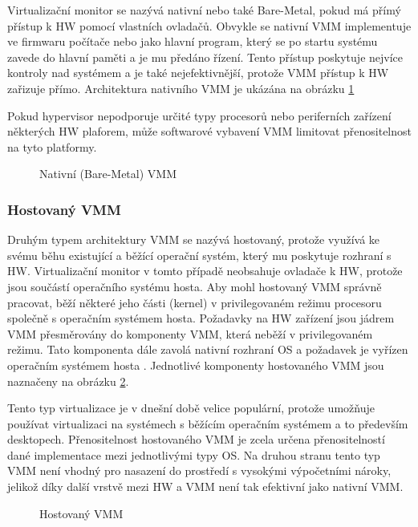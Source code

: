 Virtualizační monitor se nazývá nativní nebo také Bare-Metal, pokud má přímý přístup k HW pomocí vlastních ovladačů. Obvykle se nativní VMM implementuje ve firmwaru počítače nebo jako hlavní program, který se po startu
systému  zavede do hlavní paměti a je mu předáno řízení. Tento přístup poskytuje nejvíce kontroly nad systémem a je také nejefektivnější, protože VMM přístup k HW zařizuje přímo. Architektura nativního VMM je ukázána na 
obrázku \ref{native_vmm}

Pokud hypervisor nepodporuje určité typy procesorů nebo periferních zařízení některých HW plaforem, může softwarové vybavení VMM limitovat přenositelnost na tyto platformy.\cite{vmm1}

\begin{figure}
    \centering    
    \caption{Nativní (Bare-Metal) VMM}
    \label{native_vmm}
\end{figure}

\subsubsection*{Hostovaný VMM}

Druhým typem architektury VMM se nazývá hostovaný, protože využívá ke svému běhu existující a běžící operační systém, který mu poskytuje rozhraní s HW. Virtualizační monitor v tomto případě neobsahuje ovladače k HW, protože jsou
součástí operačního systému hosta. Aby mohl hostovaný VMM správně pracovat, běží některé jeho části (kernel) v privilegovaném režimu procesoru společně s operačním systémem hosta. Požadavky na HW zařízení jsou jádrem VMM přesměrovány
do komponenty VMM, která neběží v privilegovaném režimu. Tato komponenta dále zavolá nativní rozhraní OS a požadavek je vyřízen operačním systémem hosta \cite{vmm1}. Jednotlivé komponenty hostovaného VMM jsou naznačeny na obrázku \ref{hosted_vmm}.

Tento typ virtualizace je v dnešní době velice populární, protože umožňuje používat virtualizaci na systémech s běžícím operačním systémem a to především desktopech. Přenositelnost hostovaného VMM je zcela určena přenositelností 
dané implementace mezi jednotlivými typy OS. Na druhou stranu tento typ VMM není vhodný pro nasazení do prostředí s vysokými výpočetními nároky, jelikož díky další vrstvě mezi HW a VMM není tak efektivní jako nativní VMM.

\begin{figure}
    \centering    
    \caption{Hostovaný VMM}
    \label{hosted_vmm}
\end{figure}

